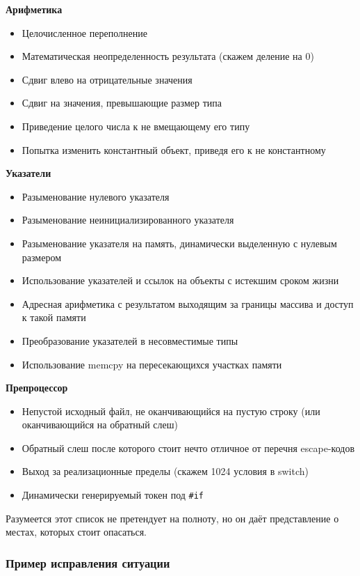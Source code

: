 \documentclass[a4paper,12pt,oneside]{article}
\begin{document}
\textbf {Арифметика}
\begin {itemize}
\item Целочисленное переполнение
\item Математическая неопределенность результата (скажем деление на 0)
\item Сдвиг влево на отрицательные значения
\item Сдвиг на значения, превышающие размер типа
\item Приведение целого числа к не вмещающему его типу
\item Попытка изменить константный объект, приведя его к не константному
\end {itemize}

\textbf {Указатели}
\begin {itemize}
\item Разыменование нулевого указателя
\item Разыменование неинициализированного указателя
\item Разыменование указателя на память, динамически выделенную с нулевым размером
\item Использование указателей и ссылок на объекты с истекшим сроком жизни
\item Адресная арифметика с результатом выходящим за границы массива и доступ к такой памяти
\item Преобразование указателей в несовместимые типы
\item Использование memcpy на пересекающихся участках памяти
\end {itemize}

\textbf {Препроцессор}
\begin {itemize}
\item Непустой исходный файл, не оканчивающийся на пустую строку (или оканчивающийся на обратный слеш)
\item Обратный слеш после которого стоит нечто отличное от перечня escape-кодов
\item Выход за реализационные пределы (скажем 1024 условия в switch)
\item Динамически генерируемый токен под \lstinline!#if!
\end {itemize}

Разумеется этот список не претендует на полноту, но он даёт представление о местах, которых стоит опасаться.

\subsubsection{Пример исправления ситуации}\label{CorrectingUB}
\end{document}
